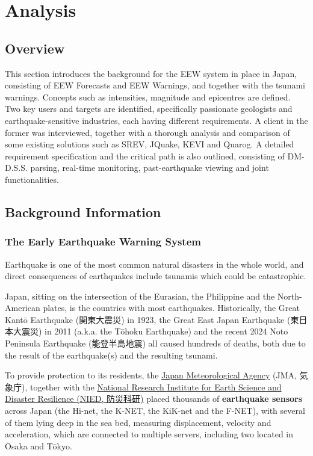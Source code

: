 \chapter{Analysis}
\section*{Overview}
This section introduces the background for the EEW system in place in Japan, consisting of EEW Forecasts and EEW Warnings, and together with the tsunami warnings. Concepts such as intensities, magnitude and epicentres are defined. Two key users and targets are identified, specifically passionate geologists and earthquake-sensitive industries, each having different requirements. A client in the former was interviewed, together with a thorough analysis and comparison of some existing solutions such as SREV, JQuake, KEVI and Quarog. A detailed requirement specification and the critical path is also outlined, consisting of DM-D.S.S. parsing, real-time monitoring, past-earthquake viewing and joint functionalities.

\section{Background Information}

\subsection{The Early Earthquake Warning System}

Earthquake is one of the most common natural disasters in the whole world, and direct consequences of earthquakes include tsunamis which could be catastrophic.

Japan, sitting on the intersection of the Eurasian, the Philippine and the North-American plates, is the countries with most earthquakes. Historically, the Great Kant\=o Earthquake (関東大震災) in 1923, the Great East Japan Earthquake (東日本大震災) in 2011 (a.k.a. the T\=ohoku Earthquake) and the recent 2024 Noto Peninsula Earthquake (能登半島地震) all caused hundreds of deaths, both due to the result of the earthquake(s) and the resulting tsunami.

To provide protection to its residents, the \href{https://www.jma.go.jp/jma/index.html}{Japan Meteorological Agency} (JMA, 気象庁), together with the \href{https://www.bosai.go.jp}{National Research Institute for Earth Science and Disaster Resilience (NIED, 防災科研)} placed thousands of \textbf{earthquake sensors} across Japan (the Hi-net, the K-NET, the KiK-net and the F-NET), with several of them lying deep in the sea bed, measuring displacement, velocity and acceleration, which are connected to multiple servers, including two located in \=Osaka and T\=okyo.

